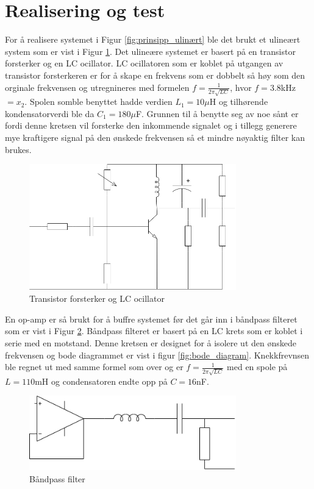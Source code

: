 \newpage
\section{Realisering og test}
\label{realiseringOgTest}

For å realisere systemet i Figur \ref{fig:prinsipp_ulinært} ble det brukt et ulineært system som er vist i Figur \ref{fig:transistor}. Det ulineære systemet er basert på en transistor forsterker og en LC ocillator. LC ocillatoren som er koblet på utgangen av transistor forsterkeren er for å skape en frekvens som er dobbelt så høy som den orginale frekvensen og utregnineres med formelen $f = \frac{1}{2\pi\sqrt{LC}}$, hvor $f=3.8$kHz$=x_2$. Spolen somble benyttet hadde verdien $L_1=10\mu$H og tilhørende kondensatorverdi ble da $C_1=180\mu$F. Grunnen til å benytte seg av noe sånt er fordi denne kretsen vil forsterke den inkommende signalet og i tillegg generere mye kraftigere signal på den ønskede frekvensen så et mindre nøyaktig filter kan brukes. 

\begin{figure}[!h]
    \centering  
    \includegraphics[width=0.8\textwidth]{Bilder/transistor.drawio.png}
    \caption{Transistor forsterker og LC ocillator}
    \label{fig:transistor}
\end{figure}

En op-amp er så brukt for å buffre systemet før det går inn i båndpass filteret som er vist i Figur \ref{fig:bandpass}. Båndpass filteret er basert på en LC krets som er koblet i serie med en motstand. Denne kretsen er designet for å isolere ut den ønskede frekvensen og bode diagrammet er vist i figur \ref{fig:bode_diagram}. Knekkfrevnsen ble regnet ut med samme formel som over og er $f = \frac{1}{2\pi\sqrt{LC}}$ med en spole på $L=110$mH og condensatoren endte opp på $C=16$nF.

\begin{figure}[!h]
    \centering  
    \includegraphics[width=0.8\textwidth]{Bilder/bandpass.drawio.png}
    \caption{Båndpass filter}
    \label{fig:bandpass}
\end{figure}

